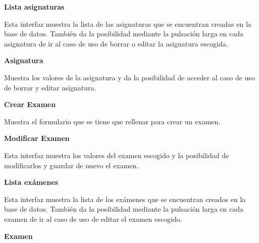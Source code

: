 \textbf{Lista asignaturas}

Esta interfaz muestra la lista de las asignaturas que se encuentran creadas en la base de datos.
También da la posibilidad mediante la pulsación larga en cada asignatura de ir al caso de uso de borrar o editar la asignatura escogida.

\textbf{Asignatura}

Muestra los valores de la asignatura y da la posibilidad de acceder al caso de uso de borrar y editar asignatura.

\textbf{Crear Examen}

Muestra el formulario que se tiene que rellenar para crear un examen.

\textbf{Modificar Examen}

Esta interfaz muestra los valores del examen escogido y la posibilidad de modificarlos y guardar de nuevo el examen.

\textbf{Lista exámenes}

Esta interfaz muestra la lista de los exámenes que se encuentran creados en la base de datos.
También da la posibilidad mediante la pulsación larga en cada examen de ir al caso de uso de editar el examen escogido.

\textbf{Examen}

